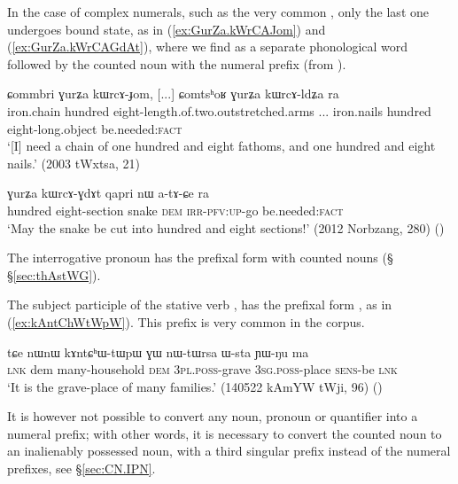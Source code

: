 In the case of complex numerals, such as the very common , only the last one undergoes bound state, as in (\ref{ex:GurZa.kWrCAJom}) and (\ref{ex:GurZa.kWrCAGdAt}), where we find  as a separate phonological word followed by the counted noun with the numeral prefix  (from ).

\begin{exe}
\ex \label{ex:GurZa.kWrCAJom}
\gll ɕommbri ɣurʑa kɯrcɤ-ɟom, [...] ɕomtsʰoʁ ɣurʑa kɯrcɤ-ldʑa ra \\
iron.chain hundred eight-length.of.two.outstretched.arms ... iron.nails hundred eight-long.object be.needed:\textsc{fact} \\
\glt  `[I] need a chain of one hundred and eight fathoms, and one hundred and eight nails.' (2003 tWxtsa, 21)
\end{exe}

\begin{exe}
\ex \label{ex:GurZa.kWrCAGdAt}
\gll  ɣurʑa kɯrcɤ-ɣdɤt qapri nɯ a-tɤ-ɕe ra \\
 hundred eight-section snake \textsc{dem} \textsc{irr}-\textsc{pfv}:\textsc{up}-go be.needed:\textsc{fact} \\
\glt `May the snake be cut into hundred and eight sections!' (2012 Norbzang,  280)
()
\end{exe}

The interrogative pronoun  has the prefixal form  with counted nouns (§ §\ref{sec:thAstWG}). 

The subject participle   of the stative verb ,  has the prefixal form , as in (\ref{ex:kAntChWtWpW}). This prefix is very common in the corpus.

\begin{exe}
\ex \label{ex:kAntChWtWpW}
\gll  tɕe nɯnɯ kɤntɕʰɯ-tɯpɯ ɣɯ nɯ-tɯrsa ɯ-sta ɲɯ-ŋu ma \\
 \textsc{lnk} dem many-household \textsc{dem} \textsc{3pl}.\textsc{poss}-grave \textsc{3sg}.\textsc{poss}-place \textsc{sens}-be \textsc{lnk} \\
\glt `It is the grave-place of many families.' (140522 kAmYW tWji, 96)
()
\end{exe}

It is however not possible to convert any noun, pronoun or quantifier into a numeral prefix; with other words, it is necessary to convert the counted noun to an inalienably possessed noun, with a third singular  prefix instead of the numeral prefixes, see §\ref{sec:CN.IPN}.  


